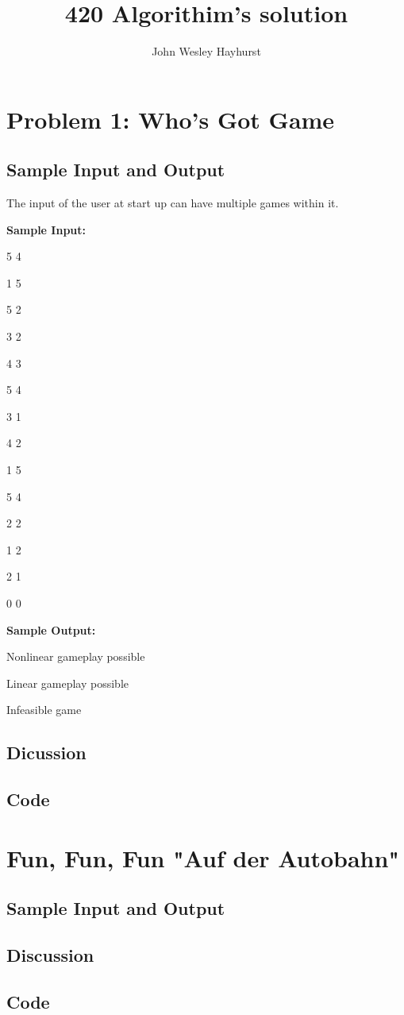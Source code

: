 \documentclass{article}
\begin{document}
  \title{420 Algorithim's solution}
  \author{John Wesley Hayhurst}
  \maketitle
\section{Problem 1: Who's Got Game}

\subsection{Sample Input and Output}
The input of the user at start up can have multiple games within it.
\begin{flushleft}

\textbf{Sample Input:}
\vspace{2mm}
\par
5 4
  
1 5
  
5 2
  
3 2
  
4 3
  
5 4
  
3 1
  
4 2
  
1 5 
  
5 4
  
2 2
  
1 2
  
2 1
  
0 0
\vspace{2mm}
\par
\textbf{Sample Output:}
\vspace{2mm}
\par
Nonlinear gameplay possible

Linear gameplay possible

Infeasible game 
\subsection{Dicussion}
\subsection{Code}
\section{Fun, Fun, Fun "Auf der Autobahn"}  
\subsection{Sample Input and Output}
\subsection{Discussion}
\subsection{Code}
\end{flushleft}
\end{document}
